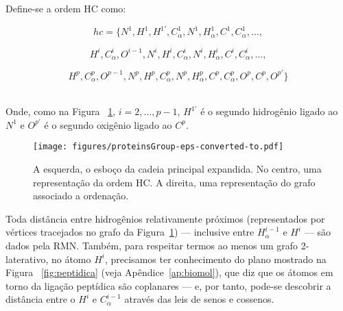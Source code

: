 Define-se a ordem HC como:

\begin{minipage}{0.532\linewidth}
	$$
	hc = \{ N^1, H^1, H^{1'}, C_{\alpha}^1, N^1, H_{\alpha}^1, C^1, C_{\alpha}^1, \dots,
	$$
	
\end{minipage}
$$
H^i, C_{\alpha}^i, O^{i-1}, N^i, H^i, C^{i}_\alpha, N^i, H^{i}_\alpha, C^i, C_{\alpha}^i,\dots,
$$

\hspace{4.5cm}
\begin{minipage}{0.532\linewidth}
	\vspace{-0.7cm}
	$$
	H^p, C_{\alpha}^p, O^{p-1}, N^p, H^p, C^{p}_\alpha, N^p, H^{p}_\alpha, C^p, C_{\alpha}^p, O^p, C^p, O^{p'}\}
	$$
\end{minipage}
\\

Onde, como na Figura ~\ref{fig:hcVO}, $i = 2, \dots, p-1$, $H^{1'}$ é o segundo hidrogênio ligado ao $N^1$ e $O^{p'}$ é o segundo oxigênio ligado ao $C^p$.

\begin{figure}[H]
	\begin{center}
		\texttt{[image: figures/proteinsGroup-eps-converted-to.pdf]}
	\end{center}
	\caption{A esquerda, o esboço da cadeia principal expandida. No centro, uma representação da ordem HC. A direita, uma representação do grafo associado a ordenação.}
	\label{fig:hcVO}
\end{figure}	

Toda distância entre hidrogênios relativamente próximos (representados por vértices tracejados no grafo da Figura~\ref{fig:hcVO}) --- inclusive entre $H_\alpha^{i-1}$ e $H^{i}$ --- são dados pela RMN. Também, para respeitar termos ao menos um grafo 2-laterativo, no átomo $H^i$, precisamos ter conhecimento do plano mostrado na Figura ~\ref{fig:peptidica} (veja Apêndice~\ref{ap:biomol}), que diz que os átomos em torno da ligação peptídica são coplanares --- e, por tanto, pode-se descobrir a distância entre o $H^i$ e $C_\alpha^{i-1}$ através das leis de senos e cossenos. 

